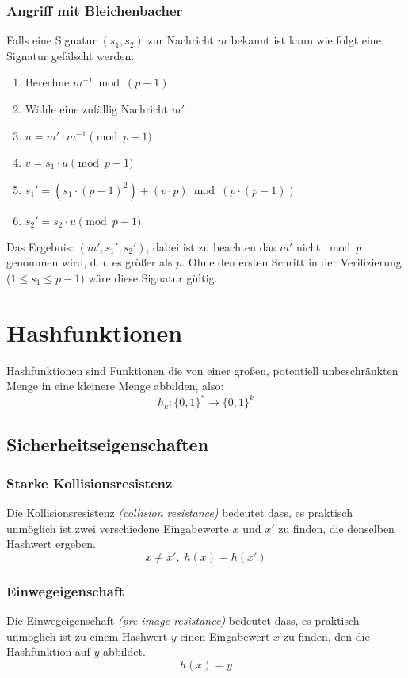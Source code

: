 \documentclass[a4paper,landscape]{article}
\begin{document}
\begin{multicols*}{4}
	\subsubsection*{Angriff mit Bleichenbacher}
	Falls eine Signatur \((s_{1},s_{2})\) zur Nachricht \(m\) bekannt ist kann
	wie folgt eine Signatur gefälscht werden:
	\begin{enumerate}
		\item Berechne \(m^{-1} \bmod (p-1)\)
		\item Wähle eine zufällig Nachricht \(m'\)
		\item \(u = m' \cdot m^{-1} \pmod{p-1}\)
		\item \(v = s_{1} \cdot u \pmod{p-1}\)
		\item \(s_{1}' = \left(s_{1} \cdot (p-1)^{2}\right) + (v \cdot p) \bmod \left(p \cdot (p-1)\right)\)
		\item \(s_{2}' = s_{2} \cdot u \pmod{p-1}\)
	\end{enumerate}
	Das Ergebnis: \((m',s_{1}',s_{2}')\), dabei ist zu beachten das \(m'\) nicht
	\(\bmod p\) genommen wird, d.h. es größer als \(p\). Ohne den ersten Schritt
	in der Verifizierung (\(1 \leq s_{1} \leq p-1\)) wäre diese Signatur gültig.

	\section{Hashfunktionen}
	Hashfunktionen sind Funktionen die von einer großen, potentiell
	unbeschränkten Menge in eine kleinere Menge abbilden, also:
	\[h_{k}: \{0,1\}^{*} \rightarrow \{0,1\}^{k}\]

	\subsection{Sicherheitseigenschaften}
	\subsubsection{Starke Kollisionsresistenz}
	Die Kollisionsresistenz \emph{(collision resistance)} bedeutet dass, es
	praktisch unmöglich ist zwei verschiedene Eingabewerte \(x\) und \(x'\) zu
	finden, die denselben Hashwert ergeben. \[x \neq x',\; h(x) = h(x')\]

	\subsubsection{Einwegeigenschaft}
	Die Einwegeigenschaft \emph{(pre-image resistance)} bedeutet dass, es
	praktisch unmöglich ist zu einem Hashwert \(y\) einen Eingabewert \(x\) zu
	finden, den die Hashfunktion auf \(y\) abbildet. \[h(x) = y\]


\end{multicols*}
\end{document}
